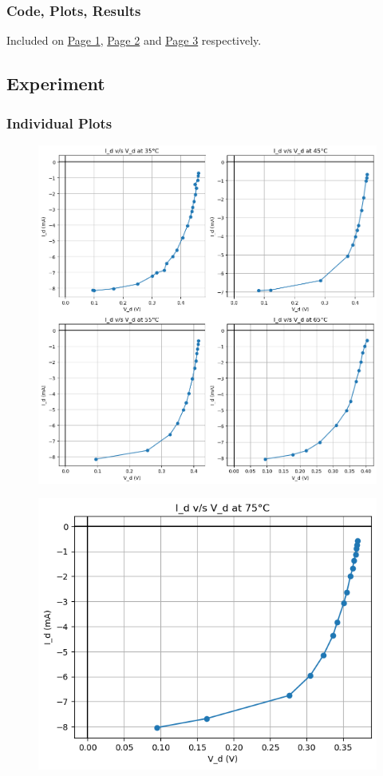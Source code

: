 \documentclass[a4paper]{article}
\begin{document}
\subsubsection{Code, Plots, Results}
Included on \hyperlink{page1}{Page 1}, \hyperlink{page2}{Page 2} and \hyperlink{page3}{Page 3} respectively.



\subsection{Experiment}
\newpage
\subsubsection{Individual Plots}
\begin{figure}[h!]
    \centering
    \includegraphics[width=1\linewidth]{Lab_5/Post_Lab/I_d_vs_V_d_Exp_2_Part_1_Summarised.png}
\end{figure}
\begin{figure}[h!]
    \centering
    \includegraphics[width=0.6\linewidth]{Lab_5/Post_Lab/I_d_vs_V_d_Exp_2_Part_2_Summarised.png}
\end{figure}
\end{document}
